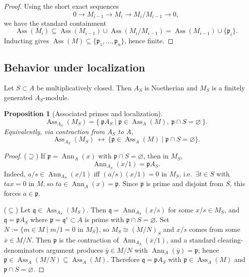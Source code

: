 \documentclass[11pt,a4paper]{article}
\theoremstyle{definition}
\theoremstyle{plain}
\newtheorem{proposition}[definition]{Proposition}
\theoremstyle{remark}
\newcommand{\Ann}{\operatorname{Ann}}
\newcommand{\Ass}{\operatorname{Ass}}
\begin{document}
\begin{proof}
Using the short exact sequences
\[
0\to M_{i-1}\to M_i\to M_i/M_{i-1}\to 0,
\]
we have the standard containment
\[
\Ass(M_i)\subseteq \Ass(M_{i-1})\cup \Ass(M_i/M_{i-1})
=\Ass(M_{i-1})\cup\{\mathfrak{p}_i\}.
\]
Inducting gives $\Ass(M)\subseteq \{\mathfrak{p}_1,\dots,\mathfrak{p}_n\}$, hence finite.
\end{proof}


\subsection*{Behavior under localization}

Let $S\subset A$ be multiplicatively closed. Then $A_S$ is Noetherian and $M_S$ is a finitely generated $A_S$-module.

\begin{proposition}[Associated primes and localization]
\[
\Ass_{A_S}(M_S)=\{\ \mathfrak{p}A_S \mid \mathfrak{p}\in \Ass_A(M),\ \mathfrak{p}\cap S=\varnothing\ \}.
\]
Equivalently, via contraction from $A_S$ to $A$,
\[
\Ass_{A_S}(M_S)\ \longleftrightarrow\ \{\mathfrak{p}\in \Ass_A(M)\mid \mathfrak{p}\cap S=\varnothing\}.
\]
\end{proposition}

\begin{proof}
($\supseteq$) If $\mathfrak{p}=\Ann_A(x)$ with $\mathfrak{p}\cap S=\varnothing$, then in $M_S$,
\[
\Ann_{A_S}(x/1)=\mathfrak{p}A_S.
\]
Indeed, $a/s\in \Ann_{A_S}(x/1)$ iff $(a/s)(x/1)=0$ in $M_S$, i.e.\ $\exists t\in S$ with $tax=0$ in $M$,
so $ta\in \Ann_A(x)=\mathfrak{p}$. Since $\mathfrak{p}$ is prime and disjoint from $S$, this forces $a\in \mathfrak{p}$.

($\subseteq$) Let $\mathfrak{q}\in \Ass_{A_S}(M_S)$. Then $\mathfrak{q}=\Ann_{A_S}(x/s)$ for some $x/s\in M_S$,
and $\mathfrak{q}=\mathfrak{p}A_S$ where $\mathfrak{p}=\mathfrak{q}^c\subset A$ is prime with $\mathfrak{p}\cap S=\varnothing$.
Set $N:=\{m\in M\mid m/1=0\text{ in }M_S\}$, so $M_S\cong (M/N)_S$ and $x/s$ comes from some $\overline{x}\in M/N$.
Then $\mathfrak{p}$ is the contraction of $\Ann_{A_S}(\overline{x}/1)$, and a standard clearing-denominators argument
produces $\overline{y}\in M/N$ with $\Ann_A(\overline{y})=\mathfrak{p}$; hence $\mathfrak{p}\in \Ass_A(M/N)\subseteq \Ass_A(M)$.
Therefore $\mathfrak{q}=\mathfrak{p}A_S$ with $\mathfrak{p}\in \Ass_A(M)$ and $\mathfrak{p}\cap S=\varnothing$.
\end{proof}
\end{document}
